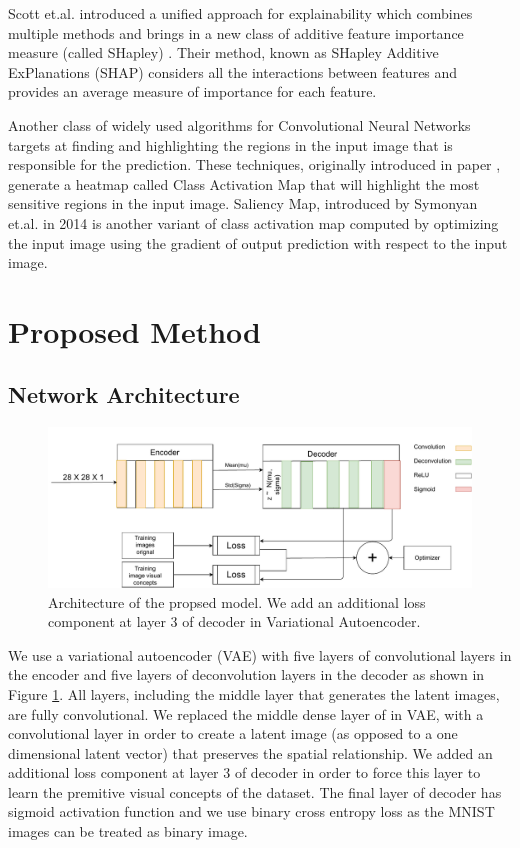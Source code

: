 \documentclass[conference]{IEEEtran}
\begin{document}
Scott et.al. introduced a unified approach for explainability which combines multiple methods and brings in a new class of additive feature importance measure (called SHapley) \cite{lundberg2017unified}.
Their method, known as SHapley Additive ExPlanations (SHAP) considers all  the interactions between features and provides an average measure of importance for each feature.

Another class of widely used algorithms for  Convolutional Neural Networks  targets at finding and highlighting the  regions in the input image that is responsible for the prediction.
These techniques, originally introduced in paper \cite{zhou2016learning}, generate a heatmap called Class Activation Map that will highlight the most sensitive regions in the input image.
Saliency Map, introduced by Symonyan et.al. in 2014 \cite{simonyan2014deep} is another variant of class activation map computed by optimizing the input image using the gradient of output prediction with respect to the input image.

\section{Proposed Method}
\subsection{Network Architecture}

\begin{figure}[!t]
\centering
\includegraphics[width=0.9\linewidth]{images/cnn_arch}
\vspace{0.2in}

\caption{Architecture of the propsed model. We add an additional loss component at layer 3 of decoder in Variational Autoencoder.}
\label{cnn_arch}
\end{figure}

We use a variational autoencoder (VAE) with five layers of convolutional layers in the encoder and five layers of deconvolution layers in the decoder as shown in Figure \ref{cnn_arch}.
All layers, including the middle layer that generates the latent images, are fully convolutional.
We replaced the middle dense layer of in VAE, with a convolutional layer in order to create a latent image (as opposed to a one dimensional latent vector) that preserves the spatial relationship.
We added an additional loss component at layer 3 of decoder in order to force this layer to learn the premitive visual concepts of the dataset.
The final layer of decoder has sigmoid activation function and we use binary cross entropy loss as the MNIST images can be treated as binary image.
\end{document}
